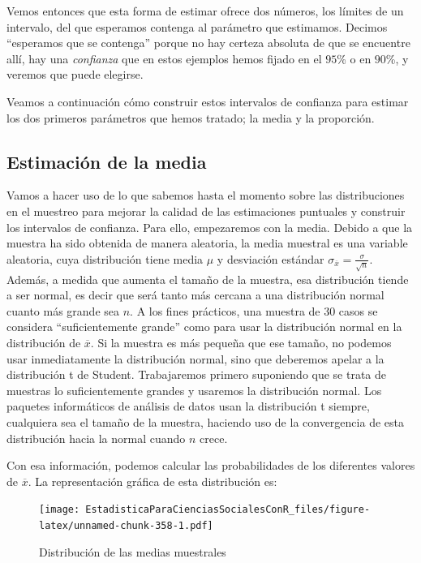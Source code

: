 \documentclass[]{book}
\begin{document}
Vemos entonces que esta forma de estimar ofrece dos números, los límites de un intervalo, del que esperamos contenga al parámetro que estimamos.
Decimos ``esperamos que se contenga'' porque no hay certeza absoluta de
que se encuentre allí, hay una \emph{confianza} que en estos ejemplos hemos
fijado en el \(95\)\% o en \(90\)\%, y veremos que puede elegirse.

Veamos a continuación cómo construir estos intervalos de confianza para
estimar los dos primeros parámetros que hemos tratado; la media y la
proporción.

\hypertarget{estimaciuxf3n-de-la-media}{%
\subsection{Estimación de la media}\label{estimaciuxf3n-de-la-media}}

Vamos a hacer uso de lo que sabemos hasta el momento sobre las
distribuciones en el muestreo para mejorar la calidad de las
estimaciones puntuales y construir los intervalos de confianza. Para
ello, empezaremos con la media. Debido a que la muestra ha sido obtenida
de manera aleatoria, la media muestral es una variable aleatoria, cuya
distribución tiene media \(\mu\) y desviación estándar
\(\sigma_{\overline{x}} = \frac{\sigma}{\sqrt{n}}\). Además, a medida que
aumenta el tamaño de la muestra, esa distribución tiende a ser normal,
es decir que será tanto más cercana a una distribución normal cuanto más
grande sea \(n\). A los fines prácticos, una muestra de 30 casos se
considera ``suficientemente grande'' como para usar la distribución normal
en la distribución de \(\overline{x}\). Si la muestra es más pequeña que
ese tamaño, no podemos usar inmediatamente la distribución normal, sino
que deberemos apelar a la distribución t de Student. Trabajaremos
primero suponiendo que se trata de muestras lo suficientemente grandes y
usaremos la distribución normal. Los paquetes informáticos de análisis
de datos usan la distribución t siempre, cualquiera sea el tamaño de la
muestra, haciendo uso de la convergencia de esta distribución hacia la
normal cuando \(n\) crece.

Con esa información, podemos calcular las probabilidades de los
diferentes valores de \(\overline{x}\). La representación gráfica de esta
distribución es:

\begin{figure}
\centering
\texttt{[image: EstadisticaParaCienciasSocialesConR\_files/figure-latex/unnamed-chunk-358-1.pdf]}
\caption{\label{fig:unnamed-chunk-358}Distribución de las medias muestrales}
\end{figure}
\end{document}
